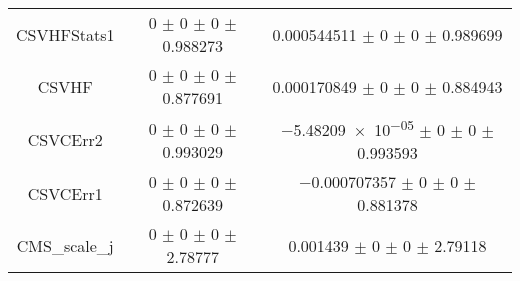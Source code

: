 \begin{table}
\begin{tabular}{ccc}
CSVHFStats1 	& \num{0} $\pm$ \num{0} $\pm$ \num{0} $\pm$ \num{0.988273} 	& \num{0.000544511} $\pm$ \num{0} $\pm$ \num{0} $\pm$ \num{0.989699}\\
CSVHF 	& \num{0} $\pm$ \num{0} $\pm$ \num{0} $\pm$ \num{0.877691} 	& \num{0.000170849} $\pm$ \num{0} $\pm$ \num{0} $\pm$ \num{0.884943}\\
CSVCErr2 	& \num{0} $\pm$ \num{0} $\pm$ \num{0} $\pm$ \num{0.993029} 	& \num{-5.48209e-05} $\pm$ \num{0} $\pm$ \num{0} $\pm$ \num{0.993593}\\
CSVCErr1 	& \num{0} $\pm$ \num{0} $\pm$ \num{0} $\pm$ \num{0.872639} 	& \num{-0.000707357} $\pm$ \num{0} $\pm$ \num{0} $\pm$ \num{0.881378}\\
CMS\_scale\_j 	& \num{0} $\pm$ \num{0} $\pm$ \num{0} $\pm$ \num{2.78777} 	& \num{0.001439} $\pm$ \num{0} $\pm$ \num{0} $\pm$ \num{2.79118}\\
\bottomrule
\end{tabular}
\end{table}